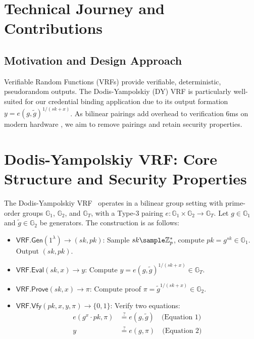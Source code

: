 \section{Technical Journey and Contributions}

\subsection{Motivation and Design Approach}
Verifiable Random Functions (VRFs) provide verifiable, deterministic, pseudorandom outputs. The Dodis-Yampolskiy (DY) VRF \cite{hutchison_verifiable_2005} is particularly well-suited for our credential binding application due to its output formation $y = e(g,\tilde{g})^{1/(sk+x)}$. As bilinear pairings add overhead to verification  6ms on modern hardware \cite{polgar_anonymous_2025}, we aim to remove pairings and retain security properties. 

\section{Dodis-Yampolskiy VRF: Core Structure and Security Properties}

The Dodis-Yampolskiy VRF~\cite{hutchison_verifiable_2005} operates in a bilinear group setting with prime-order groups $\mathbb{G}_1$, $\mathbb{G}_2$, and $\mathbb{G}_T$, with a Type-3 pairing $e: \mathbb{G}_1 \times \mathbb{G}_2 \rightarrow \mathbb{G}_T$. Let $g \in \mathbb{G}_1$ and $\tilde{g} \in \mathbb{G}_2$ be generators. The construction is as follows:

\begin{itemize}
    \item $\mathsf{VRF.Gen}(1^\lambda) \to (sk, pk)$: Sample $sk \sample \mathbb{Z}_p^*$, compute $pk = g^{sk} \in \mathbb{G}_1$. Output $(sk, pk)$.
    
    \item $\mathsf{VRF.Eval}(sk, x) \to y$: Compute $y = e(g, \tilde{g})^{1/(sk + x)} \in \mathbb{G}_T$.
    
    \item $\mathsf{VRF.Prove}(sk, x) \to \pi$: Compute proof $\pi = \tilde{g}^{1/(sk + x)} \in \mathbb{G}_2$.
    
    \item $\mathsf{VRF.Vfy}(pk, x, y, \pi) \to \{0, 1\}$: Verify two equations:
    \begin{align}
        e(g^{x} \cdot pk, \pi) &\stackrel{?}{=} e(g, \tilde{g}) \quad \text{(Equation 1)}\\
        y &\stackrel{?}{=} e(g, \pi) \quad \text{(Equation 2)}
    \end{align}
\end{itemize}

